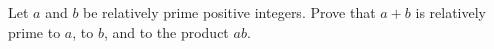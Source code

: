 Let $a$ and $b$ be relatively prime positive integers. Prove that $a+b$ is relatively prime to $a$, to $b$, and to the product $ab$.
